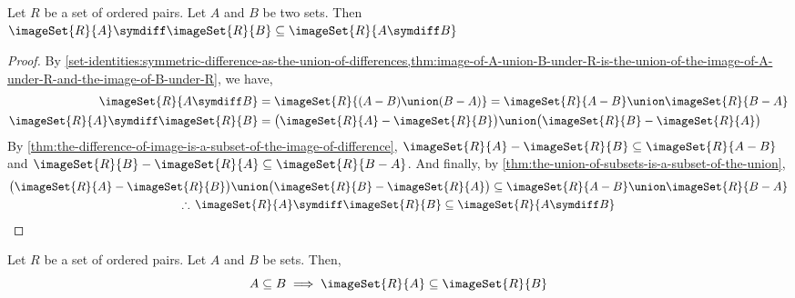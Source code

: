 \begin{thm}
    \label{thm:the-symdiff-of-image-is-a-subset-of-the-image-of-symdiff}
    Let \( R \) be a set of ordered pairs. Let \( A \) and \( B \) be two sets.
    Then \( \imageSet{R}{A} \symdiff \imageSet{R}{B} \subseteq \imageSet{R}{A \symdiff B} \)
\end{thm}

\begin{proof}
    By \cref{set-identities:symmetric-difference-as-the-union-of-differences,thm:image-of-A-union-B-under-R-is-the-union-of-the-image-of-A-under-R-and-the-image-of-B-under-R},
    we have,
    \begin{align*}
        \imageSet{R}{A \symdiff B} &= \imageSet{R}{\mleft( A - B \mright) \union \mleft( B - A \mright)} = \imageSet{R}{A - B} \union \imageSet{R}{B - A} \\
        \imageSet{R}{A} \symdiff \imageSet{R}{B} &= \big(\imageSet{R}{A} - \imageSet{R}{B} \big) \union \big( \imageSet{R}{B} - \imageSet{R}{A} \big)
    \end{align*}
    By \cref{thm:the-difference-of-image-is-a-subset-of-the-image-of-difference}, \( \imageSet{R}{A} - \imageSet{R}{B} \subseteq \imageSet{R}{A - B} \)
    and \( \imageSet{R}{B} - \imageSet{R}{A} \subseteq  \imageSet{R}{B - A} \). And finally, by \cref{thm:the-union-of-subsets-is-a-subset-of-the-union},
    \begin{gather*}
        \big( \imageSet{R}{A} - \imageSet{R}{B} \big) \union \big( \imageSet{R}{B} - \imageSet{R}{A} \big)
        \subseteq
        \imageSet{R}{A - B} \union \imageSet{R}{B - A} \\
        \therefore \, \imageSet{R}{A} \symdiff \imageSet{R}{B} \subseteq \imageSet{R}{A \symdiff B} \qedhere
    \end{gather*}
\end{proof}

\begin{thm}
    \label{thm:A-subset-B-implies-image-of-A-under-R-subset-image-of-B-under-R}
    Let \( R \) be a set of ordered pairs. Let \( A \) and \( B \) be sets. Then,
    \begin{equation*}
        A \subseteq B \implies \imageSet{R}{A} \subseteq \imageSet{R}{B}
    \end{equation*}
\end{thm}

